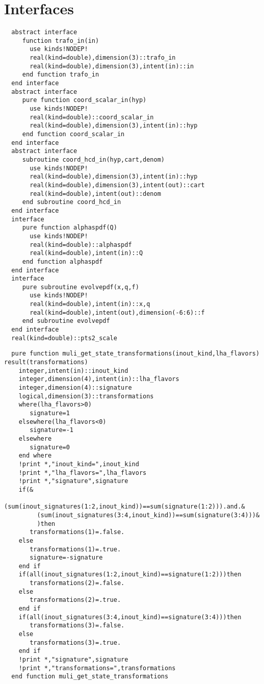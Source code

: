 \section{Interfaces}
\begin{Verbatim}
  abstract interface
     function trafo_in(in) 
       use kinds!NODEP!
       real(kind=double),dimension(3)::trafo_in
       real(kind=double),dimension(3),intent(in)::in
     end function trafo_in
  end interface
  abstract interface
     pure function coord_scalar_in(hyp)
       use kinds!NODEP!
       real(kind=double)::coord_scalar_in
       real(kind=double),dimension(3),intent(in)::hyp
     end function coord_scalar_in
  end interface
  abstract interface
     subroutine coord_hcd_in(hyp,cart,denom)
       use kinds!NODEP!
       real(kind=double),dimension(3),intent(in)::hyp
       real(kind=double),dimension(3),intent(out)::cart
       real(kind=double),intent(out)::denom
     end subroutine coord_hcd_in
  end interface
  interface
     pure function alphaspdf(Q)
       use kinds!NODEP!
       real(kind=double)::alphaspdf
       real(kind=double),intent(in)::Q
     end function alphaspdf
  end interface
  interface
     pure subroutine evolvepdf(x,q,f)
       use kinds!NODEP!
       real(kind=double),intent(in)::x,q
       real(kind=double),intent(out),dimension(-6:6)::f
     end subroutine evolvepdf
  end interface
  real(kind=double)::pts2_scale
\end{Verbatim}
\Methods
{}
\begin{Verbatim}
  pure function muli_get_state_transformations(inout_kind,lha_flavors) result(transformations)
    integer,intent(in)::inout_kind
    integer,dimension(4),intent(in)::lha_flavors
    integer,dimension(4)::signature
    logical,dimension(3)::transformations
    where(lha_flavors>0)
       signature=1
    elsewhere(lha_flavors<0)
       signature=-1
    elsewhere
       signature=0
    end where
    !print *,"inout_kind=",inout_kind
    !print *,"lha_flavors=",lha_flavors
    !print *,"signature",signature
    if(&
         (sum(inout_signatures(1:2,inout_kind))==sum(signature(1:2))).and.&
         (sum(inout_signatures(3:4,inout_kind))==sum(signature(3:4)))&
         )then
       transformations(1)=.false.
    else
       transformations(1)=.true.
       signature=-signature
    end if
    if(all(inout_signatures(1:2,inout_kind)==signature(1:2)))then
       transformations(2)=.false.
    else
       transformations(2)=.true.
    end if
    if(all(inout_signatures(3:4,inout_kind)==signature(3:4)))then
       transformations(3)=.false.
    else
       transformations(3)=.true.
    end if
    !print *,"signature",signature
    !print *,"transformations=",transformations
  end function muli_get_state_transformations
\end{Verbatim}
        
